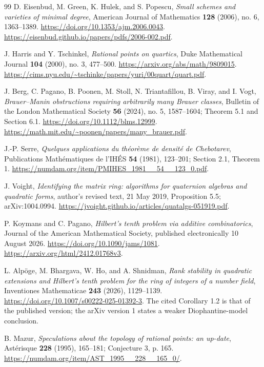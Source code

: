 \documentclass[11pt]{article}
\theoremstyle{definition}
\begin{document}
\begin{thebibliography}{99}
D. Eisenbud, M. Green, K. Hulek, and S. Popescu,
\emph{Small schemes and varieties of minimal degree}, American Journal
of Mathematics \textbf{128} (2006), no. 6, 1363--1389.
\url{https://doi.org/10.1353/ajm.2006.0043}.
\url{https://eisenbud.github.io/papers/pdfs/2006-002.pdf}.

J. Harris and Y. Tschinkel, \emph{Rational points on quartics},
Duke Mathematical Journal \textbf{104} (2000), no. 3, 477--500.
\url{https://arxiv.org/abs/math/9809015}.
\url{https://cims.nyu.edu/~tschinke/papers/yuri/00quart/quart.pdf}.

J. Berg, C. Pagano, B. Poonen, M. Stoll, N. Triantafillou, B. Viray,
and I. Vogt, \emph{Brauer--Manin obstructions requiring arbitrarily many
Brauer classes}, Bulletin of the London Mathematical Society
\textbf{56} (2024), no. 5, 1587--1604; Theorem 5.1 and Section 6.1.
\url{https://doi.org/10.1112/blms.12999}.
\url{https://math.mit.edu/~poonen/papers/many_brauer.pdf}.

J.-P. Serre, \emph{Quelques applications du th\'eor\`eme de densit\'e
de Chebotarev}, Publications Math\'ematiques de l'IH\'ES \textbf{54}
(1981), 123--201; Section 2.1, Theorem 1.
\url{https://numdam.org/item/PMIHES_1981__54__123_0.pdf}.

J. Voight, \emph{Identifying the matrix ring: algorithms for quaternion
algebras and quadratic forms}, author's revised text, 21 May 2019,
Proposition 5.5; arXiv:1004.0994.
\url{https://jvoight.github.io/articles/quatalgs-051919.pdf}.

P. Koymans and C. Pagano, \emph{Hilbert's tenth problem via additive
combinatorics}, Journal of the American Mathematical Society,
published electronically 10 August 2026.
\url{https://doi.org/10.1090/jams/1081}.
\url{https://arxiv.org/html/2412.01768v3}.

L. Alp\"oge, M. Bhargava, W. Ho, and A. Shnidman,
\emph{Rank stability in quadratic extensions and Hilbert's tenth
problem for the ring of integers of a number field}, Inventiones
Mathematicae \textbf{243} (2026), 1129--1139.
\url{https://doi.org/10.1007/s00222-025-01392-3}.
The cited Corollary 1.2 is that of the published version; the arXiv
version 1 states a weaker Diophantine-model conclusion.

B. Mazur, \emph{Speculations about the topology of rational points:
an up-date}, Ast\'erisque \textbf{228} (1995), 165--181;
Conjecture 3, p. 165.
\url{https://numdam.org/item/AST_1995__228__165_0/}.


\end{thebibliography}
\end{document}
